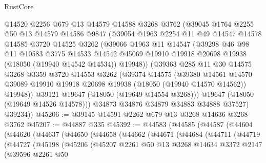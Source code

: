 \begin{lexlean}{RustCore}
\begin{coremodule}
        @14520
        @2256
        @679
        @13
        @14579
        @14588
        @3268
        @3762
        (@39045
          @1764
          @2255
          @50
          @13
          @14579
          @14586
          @9847
          (@39054
            @1963
            @2254
            @11
            @49
            @14547
            @14578
            @14585
            @3720
            @14525
            @3262
            (@39066
              @1963
              @11
              @14547
              (@39298
                @46
                @98
                @11
                @10583
                @3775
                @14533
                @14542
                @45069
                @19910
                @19918
                @20698
                @19938
                (@18050 (@19940 @14542 @14534))
                @19948))
            (@39363
              @285
              @11
              @30
              @14575
              @3268
              @3359
              @3720
              @14553
              @3262
              (@39374
                @14575
                (@39380
                  @14561
                  @14570
                  @39089
                  @19910
                  @19918
                  @20698
                  @19938
                  (@18050 (@19940 @14570 @14562))
                  @19948))
              @39121
              @19647
              (@18050 (@19649 @14554 @3268)))
            @19647
            (@18050 (@19649 @14526 @14578)))
          @34873
          @34876
          @34879
          @34883
          @34888
          @37527)
        @39234))
@45206 := @39145 @14591 @2262 @679 @13 @3268 @14636 @3268 @3762
@45207 := @44887 @335
@45392 := @44583
    (@44585
      (@44587
        (@44604
          (@44620
            (@44637
              (@44650
                (@44658
                  (@44662
                    (@44671
                      (@44684
                        (@44711
                          (@44719
                            (@44727
                              (@45198
                                (@45206
                                  (@45207
                                    @2261
                                    @50
                                    @13
                                    @3268
                                    @14634
                                    @3372
                                    @2147
                                    (@39596
                                      @2261
                                      @50

\end{coremodule}
\end{lexlean}
